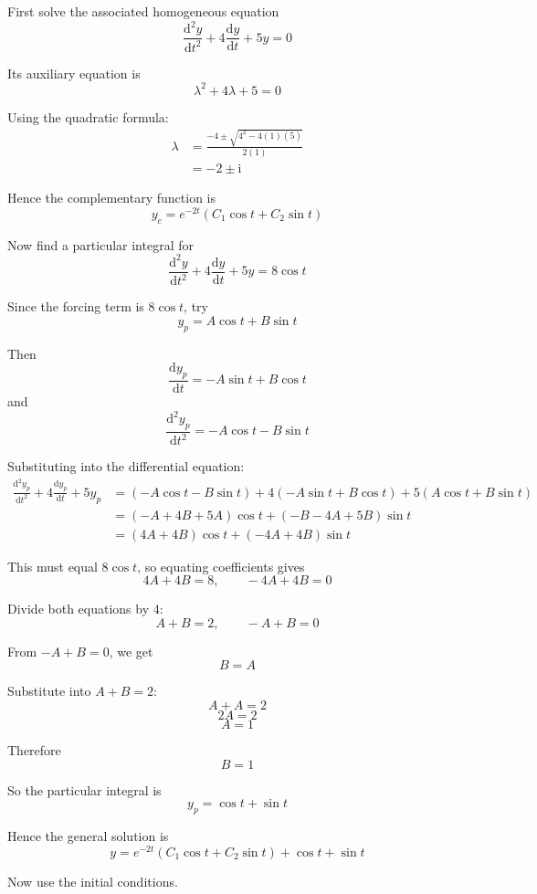 \documentclass[leqno]{article}
\begin{document}
\begin{enumerate}[
  label=\textbf{\arabic*.},
  leftmargin=*,
  topsep=0pt,
  partopsep=0pt,
  parsep=0pt
]
\vspace*{30pt}

\begin{tcolorbox}[colback=white, colframe=scarlet, title={\textbf{Solution}}, breakable, grow to left by=6mm, grow to right by=10mm]
First solve the associated homogeneous equation
\[
\frac{\mathrm{d}^2y}{\mathrm{d}t^2}+4\frac{\mathrm{d}y}{\mathrm{d}t}+5y=0
\]

Its auxiliary equation is
\[
\lambda^2+4\lambda+5=0
\]

Using the quadratic formula:
\begin{align*}
\lambda&=\frac{-4\pm\sqrt{4^2-4(1)(5)}}{2(1)}\\[4pt]
&=-2\pm \mathrm{i}
\end{align*}

Hence the complementary function is
\[
y_c=e^{-2t}(C_1\cos t+C_2\sin t)
\]

Now find a particular integral for
\[
\frac{\mathrm{d}^2y}{\mathrm{d}t^2}+4\frac{\mathrm{d}y}{\mathrm{d}t}+5y=8\cos t
\]

Since the forcing term is \(8\cos t\), try
\[
y_p=A\cos t+B\sin t
\]

Then
\[
\frac{\mathrm{d}y_p}{\mathrm{d}t}=-A\sin t+B\cos t
\]
and
\[
\frac{\mathrm{d}^2y_p}{\mathrm{d}t^2}=-A\cos t-B\sin t
\]

Substituting into the differential equation:
\begin{align*}
\frac{\mathrm{d}^2y_p}{\mathrm{d}t^2}+4\frac{\mathrm{d}y_p}{\mathrm{d}t}+5y_p
&=(-A\cos t-B\sin t)+4(-A\sin t+B\cos t)+5(A\cos t+B\sin t)\\
&=(-A+4B+5A)\cos t+(-B-4A+5B)\sin t\\
&=(4A+4B)\cos t+(-4A+4B)\sin t
\end{align*}

This must equal \(8\cos t\), so equating coefficients gives
\[
4A+4B=8,\qquad -4A+4B=0
\]

Divide both equations by \(4\):
\[
A+B=2,\qquad -A+B=0
\]

From \(-A+B=0\), we get
\[
B=A
\]

Substitute into \(A+B=2\):
\[
A+A=2
\]
\[
2A=2
\]
\[
A=1
\]

Therefore
\[
B=1
\]

So the particular integral is
\[
y_p=\cos t+\sin t
\]

Hence the general solution is
\[
y=e^{-2t}(C_1\cos t+C_2\sin t)+\cos t+\sin t
\]

Now use the initial conditions.


\end{tcolorbox}
\end{enumerate}
\end{document}
